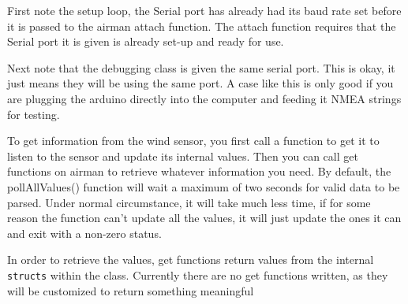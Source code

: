 \documentclass[letterpaper]{article}
\begin{document}
First note the setup loop, the Serial port has already had its baud rate set before it is passed to the airman attach function. The attach function requires that the Serial port it is given is already set-up and ready for use.

Next note that the debugging class is given the same serial port. This is okay, it just means they will be using the same port. A case like this is only good if you are plugging the arduino directly into the computer and feeding it NMEA strings for testing. 

To get information from the wind sensor, you first call a  function to get it to listen to the sensor and update its internal values. Then you can call get functions on airman to retrieve whatever information you need. By default, the pollAllValues() function will wait a maximum of two seconds for valid data to be parsed. Under normal circumstance, it will take much less time, if for some reason the function can't update all the values, it will just update the ones it can and exit with a non-zero status.

In order to retrieve the values, get functions return values from the internal \verb+structs+ within the class. Currently there are no get functions written, as they will be customized to return something meaningful

\end{document}
